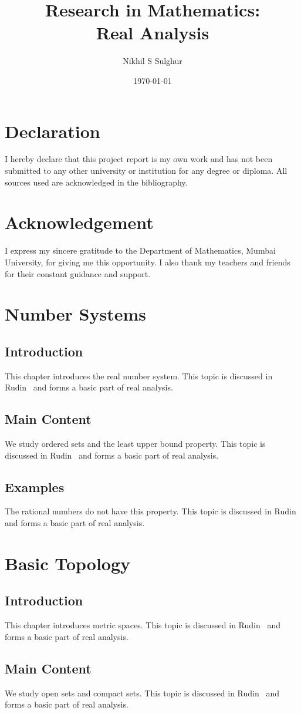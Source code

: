 \documentclass[12pt]{report}
\title{Research in Mathematics:\\Real Analysis}
\author{Nikhil S Sulghur}
\date{\today}
\newcommand{\txt}[1]{#1 This topic is discussed in Rudin~\cite{R} and forms a basic part of real analysis.}
\begin{document}
	\maketitle
	
	\chapter*{Declaration}
	I hereby declare that this project report is my own work and has not been submitted to any other university or institution for any degree or diploma. All sources used are acknowledged in the bibliography.
	
	\chapter*{Acknowledgement}
	I express my sincere gratitude to the Department of Mathematics, Mumbai University, for giving me this opportunity. I also thank my teachers and friends for their constant guidance and support.
	
	\tableofcontents
	
	\chapter{Number Systems}
	\section{Introduction}
	\txt{This chapter introduces the real number system\index{real numbers}.}
	\section{Main Content}
	\txt{We study ordered sets and the least upper bound property.}
	\section{Examples}
	\txt{The rational numbers do not have this property.}
	
	\chapter{Basic Topology}
	\section{Introduction}
	\txt{This chapter introduces metric spaces.}
	\section{Main Content}
	\txt{We study open sets and compact sets.}
\end{document}
